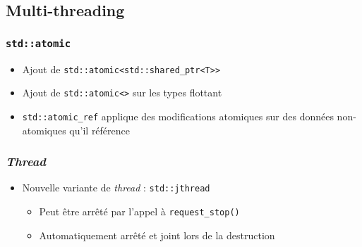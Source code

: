 \documentclass[C++.tex]{subfiles}
\begin{document}
\subsection*{Multi-threading}
\begin{frame}[fragile]
	\frametitle{\lstinline|std::atomic|}
	\begin{itemize}
		\item Ajout de \lstinline|std::atomic<std::shared_ptr<T>>|
		\item Ajout de \lstinline|std::atomic<>| sur les types flottant
		\item \lstinline|std::atomic_ref| applique des modifications atomiques sur des données non-atomiques qu'il référence
	\end{itemize}
\end{frame}

\begin{frame}[fragile]
	\frametitle{\textit{Thread}}
	\begin{itemize}
		\item Nouvelle variante de \textit{thread} : \lstinline|std::jthread|
		\begin{itemize}
			\item Peut être arrêté par l'appel à \lstinline|request_stop()|
			\item Automatiquement arrêté et joint lors de la destruction
		\end{itemize}

	\end{itemize}
\end{frame}
\end{document}
